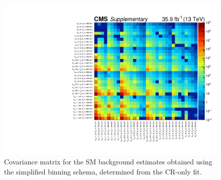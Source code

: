 \clearpage
\begin{figure}
  \centering
  \includegraphics[width=\textwidth]{Supplementary/covariance_aux}
  \caption{Covariance matrix for the SM background estimates obtained
    using the simplified binning schema, determined from the CR-only
    fit.  }
  \label{fig:covariance_aux}
\end{figure} 
